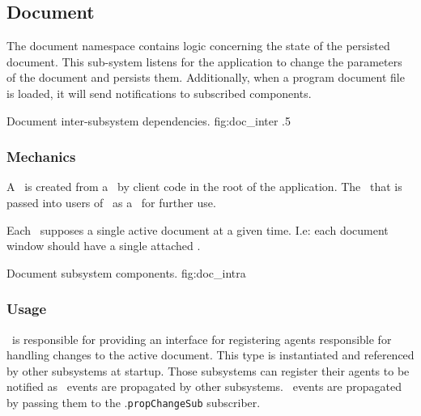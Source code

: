 \newcommand{\docarea}[3]{
      \index{#1}\pbodyitem{#2}{#3}
}

\newcommand{\extparamref}[3]{
      \index{#1}\pbodyitem{#2}{#3}
}

\subsection{Document}
The document namespace contains logic concerning the state of the persisted document.
This sub-system listens for the application to change the parameters of the document and persists them.
Additionally, when a program document file is loaded, it will send notifications to subscribed components.

{Document inter-subsystem dependencies.}
{fig:doc_inter}
{.5}


\subsubsection{Mechanics}
A \docsftype\ is created from a \docsfftype\ by client code in the root of the application.
The \docsftype\ that is passed into users of \docmod\ as a \docftype\ for further use.

Each \docftype\ supposes a single active document at a given time.
I.e: each document window should have a single attached \docftype.

{Document subsystem components.}
{fig:doc_intra}



\subsubsection{Usage}
\docftype\ is responsible for providing an interface for registering agents responsible for handling changes to the active document.
This type is instantiated and referenced by other subsystems at startup.
Those subsystems can register their agents to be notified as \docpctype\ events are propagated by other subsystems.
\docpctype\ events are propagated by passing them to the \docftype .\texttt{propChangeSub} subscriber.